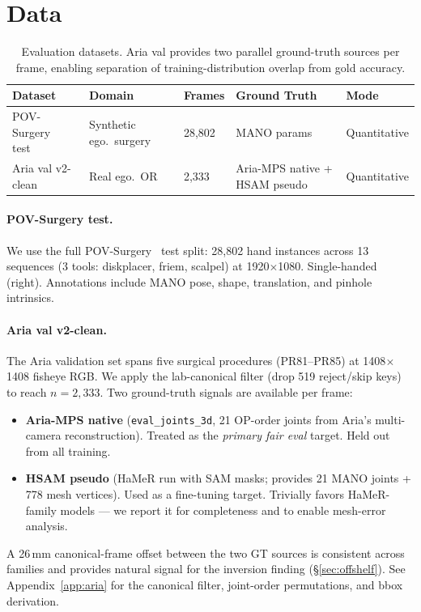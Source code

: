\documentclass{article}
\begin{document}
\section{Data}
\label{sec:data}

\begin{table}[h]
\centering
\small
\caption{Evaluation datasets. Aria val provides two parallel ground-truth sources per frame, enabling separation of training-distribution overlap from gold accuracy.}
\label{tab:datasets}
\begin{tabular}{lllll}
\toprule
\textbf{Dataset} & \textbf{Domain} & \textbf{Frames} & \textbf{Ground Truth} & \textbf{Mode} \\
\midrule
POV-Surgery test~\cite{wang2023povsurgery} & Synthetic ego.\ surgery & 28{,}802 & MANO params & Quantitative \\
Aria val v2-clean & Real ego.\ OR  & 2{,}333 & Aria-MPS native + HSAM pseudo & Quantitative \\
\bottomrule
\end{tabular}
\end{table}

\paragraph{POV-Surgery test.}
We use the full POV-Surgery~\cite{wang2023povsurgery} test split: 28,802 hand instances across 13 sequences (3 tools: diskplacer, friem, scalpel) at 1920$\times$1080. Single-handed (right). Annotations include MANO pose, shape, translation, and pinhole intrinsics.

\paragraph{Aria val v2-clean.}
The Aria validation set spans five surgical procedures (PR81–PR85) at 1408$\times$1408 fisheye RGB. We apply the lab-canonical filter (drop 519 reject/skip keys) to reach $n{=}2{,}333$. Two ground-truth signals are available per frame:
\begin{itemize}[nosep]
  \item \textbf{Aria-MPS native} (\texttt{eval\_joints\_3d}, 21 OP-order joints from Aria's multi-camera reconstruction). Treated as the \emph{primary fair eval} target. Held out from all training.
  \item \textbf{HSAM pseudo} (HaMeR run with SAM masks; provides 21 MANO joints + 778 mesh vertices). Used as a fine-tuning target. Trivially favors HaMeR-family models — we report it for completeness and to enable mesh-error analysis.
\end{itemize}
A 26\,mm canonical-frame offset between the two GT sources is consistent across families and provides natural signal for the inversion finding (\S\ref{sec:offshelf}). See Appendix~\ref{app:aria} for the canonical filter, joint-order permutations, and bbox derivation.
\end{document}
